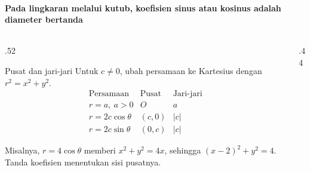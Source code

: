 \documentclass{../../kalkulus-ppt}
\newcommand{\sumbubidang}[4]{%
    \draw[sumbu] (#1,0) -- (#2,0) node[right,font=\scriptsize] {$x$};
    \draw[sumbu] (0,#3) -- (0,#4) node[above,font=\scriptsize] {$y$};
}
\begin{document}
\begin{frame}{\insertsection}
    \framesubtitle{Pada lingkaran melalui kutub, koefisien sinus atau kosinus adalah diameter bertanda}
    \begin{columns}[c,onlytextwidth]
        \begin{column}{.52\textwidth}
            \begin{block}{Pusat dan jari-jari}
                Untuk $c\ne0$, ubah persamaan ke Kartesius
                dengan $r^2=x^2+y^2$.
                \[
                    \begin{array}{l|cc}
                        \text{Persamaan} & \text{Pusat} & \text{Jari-jari}\\ \hline
                        r=a,\ a>0 & O & a\\
                        r=2c\cos\theta & (c,0) & |c|\\
                        r=2c\sin\theta & (0,c) & |c|
                    \end{array}
                \]
            \end{block}
            Misalnya, $r=4\cos\theta$ memberi
            $x^2+y^2=4x$, sehingga $(x-2)^2+y^2=4$.
            Tanda koefisien menentukan sisi pusatnya.
        \end{column}
        \begin{column}{.44\textwidth}
            \centering
        \end{column}
    \end{columns}
\end{frame}
\end{document}
